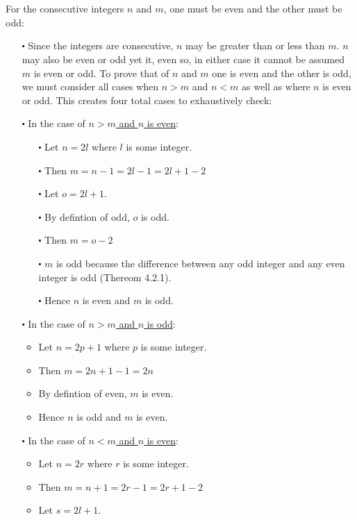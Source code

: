 \documentclass[12pt]{article}
\begin{document}
\newblock
\\ \\
For the consecutive integers $n$ and $m$, one must be even and the other must be odd:
\begin{itemize}
  \item [$\centerdot$] Since the integers are consecutive, $n$ may be greater than or less than $m$. 
  $n$ may also be even or odd yet it, even so, in either case it cannot be assumed $m$ is even or odd.
  To prove that of $n$ and $m$ one is even and the other is odd, we must consider all cases when $n>m$ and $n<m$ as well as where $n$ is even or odd.
  This creates four total cases to exhaustively check:
  \item [$\centerdot$] In the case of \underline{$n>m$ and $n$ is even}:
  \begin{itemize}
    \item [$\centerdot$] Let $n = 2l$ where $l$ is some integer.
    \item [$\centerdot$] Then $m = n-1 = 2l-1 = 2l+1-2$
    \item [$\centerdot$] Let $o=2l+1$.
    \item [$\centerdot$] By defintion of odd, $o$ is odd.
    \item [$\centerdot$] Then $m = o - 2$
    \item [$\centerdot$] $m$ is odd because the difference between any odd integer and any even integer is odd (Thereom 4.2.1).
    \item [$\centerdot$] Hence $n$ is even and $m$ is odd.
  \end{itemize}
  \item [$\centerdot$] In the case of \underline{$n>m$ and $n$ is odd}:
  \begin{itemize}
    \item  Let $n = 2p+1$ where $p$ is some integer.
    \item  Then $m = 2n + 1 -1 = 2n$
    \item  By defintion of even, $m$ is even.
    \item  Hence $n$ is odd and $m$ is even.
  \end{itemize}
  \item [$\centerdot$] In the case of \underline{$n<m$ and $n$ is even}:
  \begin{itemize}
    \item  Let $n = 2r$ where $r$ is some integer.
    \item  Then $m = n+1 = 2r-1 = 2r+1-2$
    \item  Let $s=2l+1$.

\end{itemize}
\end{itemize}
\end{document}
